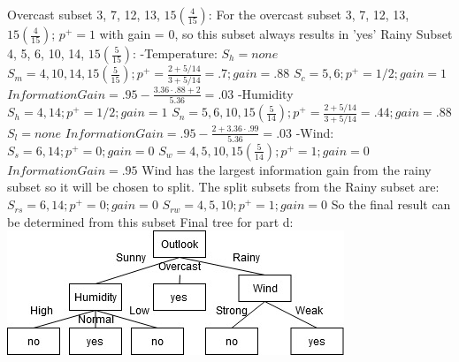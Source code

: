 \documentclass[12pt, fullpage,letterpaper]{article}
\begin{document}
\begin{enumerate}
\begin{enumerate}
	\newline
	\newline Overcast subset 3, 7, 12, 13, $15(\frac{4}{15})$:
	\newline For the overcast subset 3, 7, 12, 13, $15(\frac{4}{15})$; $p^+=1$ with  gain = 0, so this subset always results in 'yes'
	\newline
	\newline Rainy Subset 4, 5, 6, 10, 14, $15(\frac{5}{15})$:
	\newline -Temperature:
	\newline $S_h = none$
	\newline $S_m=4, 10, 14, 15(\frac{5}{15}); p^+=\frac{2+5/14}{3+5/14}=.7;  gain=.88$
	\newline $S_c=5, 6; p^+=1/2;  gain=1$
	\newline $Information Gain=.95-\frac{3.36\cdot.88+2}{5.36}=.03$
	\newline -Humidity
	\newline $S_h = 4, 14; p^+=1/2;  gain=1$
	\newline $S_n=5, 6, 10, 15(\frac{5}{14}); p^+=\frac{2+5/14}{3+5/14}=.44;  gain=.88$
	\newline $S_l=none$
	\newline $Information Gain=.95-\frac{2+3.36\cdot.99}{5.36}=.03$
	\newline -Wind:
	\newline $S_s = 6, 14; p^+=0;  gain=0$
	\newline $S_w=4, 5, 10, 15(\frac{5}{14}); p^+=1;  gain=0$
	\newline $Information Gain=.95$
	\newline Wind has the largest information gain from the rainy subset so it will be chosen to split. 
	\newline
	\newline The split subsets from the Rainy subset are:
	\newline $S_{rs}=6, 14; p^+=0;  gain = 0$
	\newline $S_{rw}=4, 5, 10; p^+=1;  gain = 0$
	\newline So the final result can be determined from this subset
	\newline
	\newline Final tree for part d:
	\newline
	\newline \includegraphics{cs5350hw1_2a.jpg}

\end{enumerate}

\end{enumerate}
\end{document}
